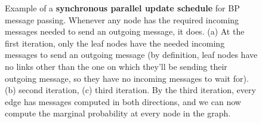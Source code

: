 \begin{figure}
\centerline{
}
\caption{Example of a {\bf synchronous parallel update schedule} for BP
  message passing.  Whenever any node has the required incoming
  messages needed to send an outgoing message, it does.  (a) At the
  first iteration, only the leaf nodes have the needed incoming
  messages to send an outgoing message (by definition, leaf nodes have
  no links other than the one on which they'll be sending their
  outgoing message, so they have no incoming messages to wait for).   (b) second iteration,
  (c) third iteration.  By the third iteration, every edge has
  messages computed in both directions, and we can now compute the
  marginal probability at every node in the graph.} 
\label{fig:men}
\end{figure}




